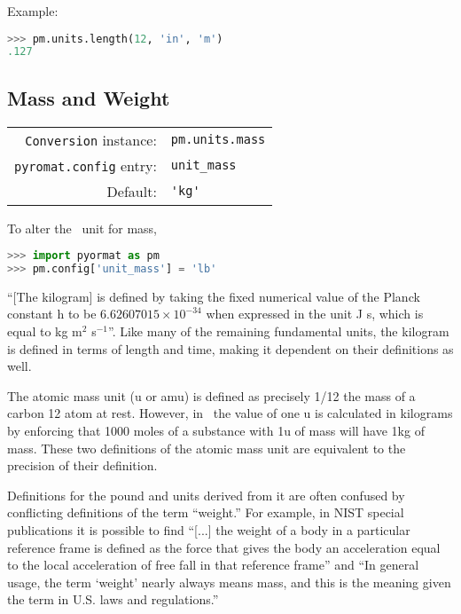 Example:
\begin{lstlisting}[language=Python]
>>> pm.units.length(12, 'in', 'm')
.127
\end{lstlisting}


%
%

\subsection{Mass and Weight}\label{sec:units:mass}

\begin{tabular}{rl}
\hline
\verb|Conversion| instance: & \verb|pm.units.mass|\\
\verb|pyromat.config| entry: & \verb|unit_mass|\\
Default: & \verb|'kg'|\\
\hline
\end{tabular}
\vspace{1em}

To alter the \PM\ unit for mass,
\begin{lstlisting}[language=Python]
>>> import pyormat as pm
>>> pm.config['unit_mass'] = 'lb'
\end{lstlisting}

``[The kilogram] is defined by taking the fixed numerical value of the Planck constant h to be $6.62607015\times 10^{-34}$ when expressed in the unit J s, which is equal to kg m$^2$ s$^{-1}$''\cite{bipm}.  Like many of the remaining fundamental units, the kilogram is defined in terms of length and time, making it dependent on their definitions as well.

The atomic mass unit (u or amu) is defined as precisely 1/12 the mass of a carbon 12 atom at rest.  However, in \PM\ the value of one u is calculated in kilograms by enforcing that 1000 moles of a substance with 1u of mass will have 1kg of mass.  These two definitions of the atomic mass unit are equivalent to the precision of their definition\cite[p.209]{bipm}.

Definitions for the pound and units derived from it are often confused by conflicting definitions of the term ``weight.''  For example, in NIST special publications it is possible to find ``[...] the  weight  of  a  body  in  a  particular  reference  frame  is  defined  as  the  force that gives the body an acceleration equal to the local acceleration of free fall in that reference frame''\cite[p.23]{nist:sp811} and ``In general usage, the term `weight' nearly always means mass, and this is the meaning given the term in U.S. laws and regulations.'' \cite[p.10]{nist:sp1038}

